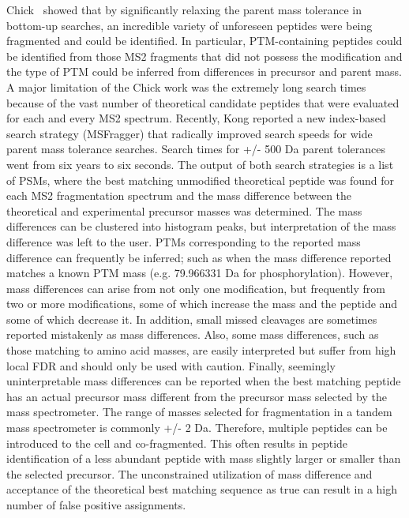 \documentclass[journal=jprobs,manuscript=article]{achemso}
\begin{document}
Chick~\citep{Chick_2015} showed that by significantly relaxing the parent mass tolerance in bottom-up searches, an incredible variety of unforeseen peptides were being fragmented and could be identified.
In particular, PTM-containing peptides could be identified from those MS2 fragments that did not possess the modification and the type of PTM could be inferred from differences in precursor and parent mass.
A major limitation of the Chick work was the extremely long search times because of the vast number of theoretical candidate peptides that were evaluated for each and every MS2 spectrum.
Recently, Kong\cite{Kong_2017} reported a new index-based search strategy (MSFragger) that radically improved search speeds for wide parent mass tolerance searches.
Search times for +/- 500 Da parent tolerances went from six years to six seconds.
The output of both search strategies is a list of PSMs, where the best matching unmodified theoretical peptide was found for each MS2 fragmentation spectrum and the mass difference between the theoretical and experimental precursor masses was determined.
The mass differences can be clustered into histogram peaks\citep{Rodriguez_2014}, but interpretation of the mass difference was left to the user.
PTMs corresponding to the reported mass difference can frequently be inferred; such as when the mass difference reported matches a known PTM mass (e.g. 79.966331 Da for phosphorylation).
However, mass differences can arise from not only one modification, but frequently from two or more modifications, some of which increase the mass and the peptide and some of which decrease it. In addition, small missed cleavages are sometimes reported mistakenly as mass differences. Also, some mass differences, such as those matching to amino acid masses, are easily interpreted but suffer from high local FDR and should only be used with caution. Finally, seemingly uninterpretable mass differences can be reported when the best matching peptide has an actual precursor mass different from the precursor mass selected by the mass spectrometer. The range of masses selected for fragmentation in a tandem mass spectrometer is commonly +/- 2 Da. Therefore, multiple peptides can be introduced to the cell and co-fragmented. This often results in peptide identification of a less abundant peptide with mass slightly larger or smaller than the selected precursor.
The unconstrained utilization of mass difference and acceptance of the theoretical best matching sequence as true can result in a high number of false positive assignments. 
\end{document}
